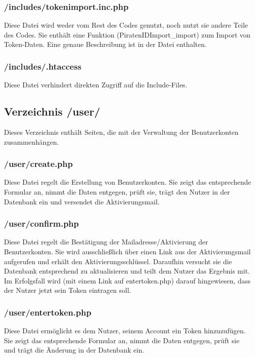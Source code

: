 \documentclass[parskip=half]{scrartcl}
\begin{document}
\subsubsection{/includes/tokenimport.inc.php}
Diese Datei wird weder vom Rest des Codes genutzt, noch nutzt sie andere Teile des Codes.
Sie enthält eine Funktion (PiratenIDImport\_import) zum Import von Token-Daten.
Eine genaue Beschreibung ist in der Datei enthalten.

\subsubsection{/includes/.htaccess}
Diese Datei verhindert direkten Zugriff auf die Include-Files.



\subsection{Verzeichnis /user/}
Dieses Verzeichnis enthält Seiten, die mit der Verwaltung der Benutzerkonten zusammenhängen.

\subsubsection{/user/create.php}
Diese Datei regelt die Erstellung von Benutzerkonten.
Sie zeigt das entsprechende Formular an, nimmt die Daten entgegen, prüft sie, trägt den Nutzer in der Datenbank ein und versendet die Aktivierungsmail.

\subsubsection{/user/confirm.php}
Diese Datei regelt die Bestätigung der Mailadresse/Aktivierung der Benutzerkonten.
Sie wird ausschließlich über einen Link aus der Aktivierungsmail aufgerufen und erhält den Aktivierungsschlüssel.
Daraufhin versucht sie die Datenbank entsprechend zu aktualisieren und teilt dem Nutzer das Ergebnis mit.
Im Erfolgsfall wird (mit einem Link auf entertoken.php) darauf hingewiesen, dass der Nutzer jetzt sein Token eintragen soll.

\subsubsection{/user/entertoken.php}
Diese Datei ermöglicht es dem Nutzer, seinem Account ein Token hinzuzufügen.
Sie zeigt das entsprechende Formular an, nimmt die Daten entgegen, prüft sie und trägt die Änderung in der Datenbank ein.
\end{document}
